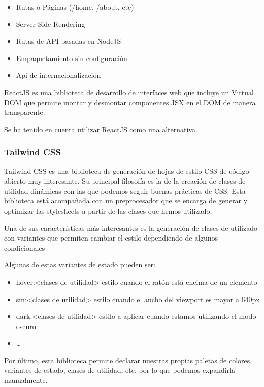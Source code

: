 \begin{itemize}
\item
  Rutas o Páginas (/home, /about, etc)
\item
  Server Side Rendering
\item
  Rutas de API basadas en NodeJS
\item
  Empaquetamiento sin configuración
\item
  Api de internacionalización
\end{itemize}

ReactJS es una biblioteca de desarrollo de interfaces web que incluye un
Virtual DOM que permite montar y desmontar componentes JSX en el DOM de
manera transparente.

Se ha tenido en cuenta utilizar ReactJS como una alternativa.

\hypertarget{tailwind-css}{%
\subsubsection{\texorpdfstring{Tailwind CSS
}{Tailwind CSS }}\label{tailwind-css}}

Tailwind CSS es una biblioteca de generación de hojas de estilo CSS de
código abierto muy interesante. Su principal filosofía es la de la
creación de clases de utilidad dinámicas con las que podemos seguir
buenas prácticas de CSS. Esta biblioteca está acompañada con un
preprocesador que se encarga de generar y optimizar las stylesheets a
partir de las clases que hemos utilizado.

Una de sus características más interesantes es la generación de clases
de utilizado con variantes que permiten cambiar el estilo dependiendo de
algunos condicionales

Algunas de estas variantes de estado pueden ser:

\begin{itemize}
\item
  hover:\textless clases de utilidad\textgreater{} estilo cuando el
  ratón está encima de un elemento
\item
  sm:\textless clases de utilidad\textgreater{} estilo cuando el ancho
  del viewport es mayor a 640px
\item
  dark:\textless clases de utilidad\textgreater{} estilo a aplicar
  cuando estamos utilizando el modo oscuro
\item
  \ldots{}
\end{itemize}

Por último, esta biblioteca permite declarar nuestras propias paletas de
colores, variantes de estado, clases de utilidad, etc, por lo que
podemos expandirla manualmente.

